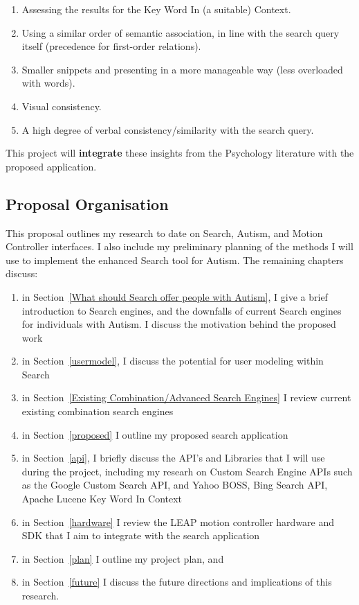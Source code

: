 \documentclass[10pt]{article}
\begin{document}
\begin{enumerate}
\item Assessing the results for the Key Word In (a suitable) Context.
\item Using a similar order of semantic association, in line with the search query itself (precedence for first-order relations). 
\item Smaller snippets and presenting in a more manageable way (less overloaded with words).
\item Visual consistency.
\item A high degree of verbal consistency/similarity with the search query.
\end{enumerate}

This project will \textbf{integrate} these insights from the Psychology literature with the proposed application.

\subsection{Proposal Organisation}

This proposal outlines my research to date on Search, Autism, and Motion Controller interfaces. I also include my preliminary planning of the methods I will use to implement the enhanced Search tool for Autism. The remaining chapters discuss:
\begin{enumerate}
\item in Section~\ref{What should Search offer people with Autism}, I give a brief introduction to Search engines, and the downfalls of current Search engines for individuals with Autism. I discuss the motivation behind the proposed work
\item in Section~\ref{usermodel}, I discuss the potential for user modeling within Search
\item in Section~\ref{Existing Combination/Advanced Search Engines} I review current existing combination search engines 
\item in Section~\ref{proposed} I outline my proposed search application
\item in Section~\ref{api}, I briefly discuss the API's and Libraries that I will use during the project, including my researh on Custom Search Engine APIs such as the Google Custom Search API, and Yahoo BOSS, Bing Search API, Apache Lucene Key Word In Context
\item in Section~\ref{hardware} I review the LEAP motion controller hardware and SDK that I aim to integrate with the search application
\item in Section~\ref{plan} I outline my project plan, and
\item in Section~\ref{future} I discuss the future directions and implications of this research.
\end{enumerate}
\end{document}
